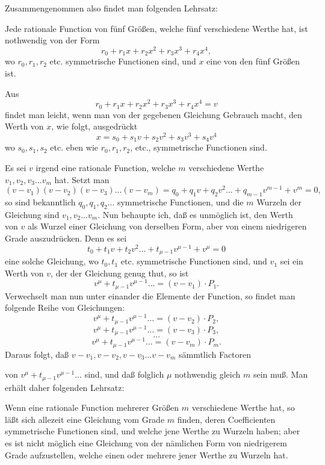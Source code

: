 \documentclass{article}
\begin{document}
Zusammengenommen also findet man folgenden Lehrsatz:

Jede rationale Function von fünf Größen, welche fünf verschiedene Werthe hat, ist nothwendig von der Form
\[ r_0 + r_1 x + r_2 x^{2} + r_3 x^{3} + r_4 x^{4}, \]
wo $r_0, r_1, r_2$ etc. symmetrische Functionen sind, und $x$ eine von den fünf Größen ist.

Aus
\[ r_0 + r_1 x + r_2 x^{2} + r_3 x^{3} + r_4 x^{4} = v \]
findet man leicht, wenn man von der gegebenen Gleichung Gebrauch macht, den Werth von $x$, wie folgt, ausgedrückt
\[ x = s_0 + s_1 v + s_2 v^{2} + s_3 v^{3} + s_4 v^{4} \]
wo $s_0, s_1, s_2$ etc. eben wie $r_0, r_1, r_2$, etc., symmetrische Functionen sind.

Es sei $v$ irgend eine rationale Function, welche $m$ verschiedene Werthe $v_1, v_2, v_3 \ldots v_m$ hat. Setzt man
\[ (v - v_1)(v - v_2)(v - v_3) \ldots (v - v_m) = q_0 + q_1 v + q_2 v^{2} \ldots + q_{m-1} v^{m-1} + v^{m} = 0, \]
so sind bekanntlich $q_0, q_1, q_2 \ldots$ symmetrische Functionen, und die $m$ Wurzeln der Gleichung sind $v_1, v_2 \ldots v_m$. Nun behaupte ich, daß es unmöglich ist, den Werth von $v$ als Wurzel einer Gleichung von derselben Form, aber von einem niedrigeren Grade auszudrücken. Denn es sei
\[ t_0 + t_1 v + t_2 v^{2} \ldots + t_{\mu-1} v^{\mu-1} + v^{\mu} = 0 \]
eine solche Gleichung, wo $t_0, t_1$ etc. symmetrische Functionen sind, und $v_1$ sei ein Werth von $v$, der der Gleichung genug thut, so ist
\[ v^{\mu} + t_{\mu-1} v^{\mu-1} \ldots = (v - v_1) \cdot P_1. \]
Verwechselt man nun unter einander die Elemente der Function, so findet man folgende Reihe von Gleichungen:
\[ v^{\mu} + t_{\mu-1} v^{\mu-1} \ldots = (v - v_2) \cdot P_2, \]
\[ v^{\mu} + t_{\mu-1} v^{\mu-1} \ldots = (v - v_3) \cdot P_3, \]
\[ \ldots \]
\[ v^{\mu} + t_{\mu-1} v^{\mu-1} \ldots = (v - v_m) \cdot P_m. \]
Daraus folgt, daß $v - v_1, v - v_2, v - v_3 \ldots v - v_m$ sämmtlich Factoren

von $v^{\mu} + t_{\mu-1} v^{\mu-1} \ldots$ sind, und daß folglich $\mu$ nothwendig gleich $m$ sein muß. Man erhält daher folgenden Lehrsatz:

Wenn eine rationale Function mehrerer Größen $m$ verschiedene Werthe hat, so läßt sich allezeit eine Gleichung vom Grade $m$ finden, deren Coefficienten symmetrische Functionen sind, und welche jene Werthe zu Wurzeln haben; aber es ist nicht möglich eine Gleichung von der nämlichen Form von niedrigerem Grade aufzustellen, welche einen oder mehrere jener Werthe zu Wurzeln hat.
\end{document}
